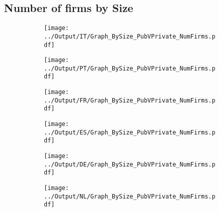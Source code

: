 \documentclass[12pt,notitlepage]{article}
\begin{document}
\subsection{Number of firms by Size}
\begin{figure}[!htpb]
\centering
\begin{subfigure}{.49\textwidth}
    \centering
 \texttt{[image: ../Output/IT/Graph\_BySize\_PubVPrivate\_NumFirms.pdf]}
\end{subfigure}%
\begin{subfigure}{.49\textwidth}
    \centering
 \texttt{[image: ../Output/PT/Graph\_BySize\_PubVPrivate\_NumFirms.pdf]}
\end{subfigure}
\begin{subfigure}{.49\textwidth}
    \centering
 \texttt{[image: ../Output/FR/Graph\_BySize\_PubVPrivate\_NumFirms.pdf]}
\end{subfigure}%
\begin{subfigure}{.49\textwidth}
    \centering
 \texttt{[image: ../Output/ES/Graph\_BySize\_PubVPrivate\_NumFirms.pdf]}
\end{subfigure}
\begin{subfigure}{.49\textwidth}
    \centering
 \texttt{[image: ../Output/DE/Graph\_BySize\_PubVPrivate\_NumFirms.pdf]}
\end{subfigure}
\begin{subfigure}{.49\textwidth}
    \centering
 \texttt{[image: ../Output/NL/Graph\_BySize\_PubVPrivate\_NumFirms.pdf]}
\end{subfigure}
\end{figure}
\end{document}
